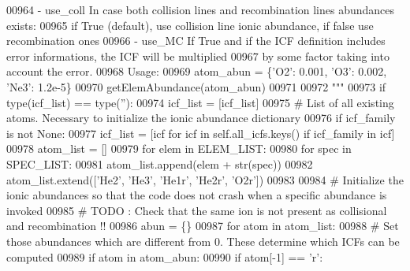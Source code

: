 \begin{DoxyCode}
{{{00964 \textcolor{stringliteral}{           - use\_coll     In case both collision lines and recombination lines abundances exists:}
00965 \textcolor{stringliteral}{                           if True (default), use collision line ionic abundance, if false use
       recombination ones}
00966 \textcolor{stringliteral}{           - use\_MC       If True and if the ICF definition includes error informations, the ICF will be
       multiplied}
00967 \textcolor{stringliteral}{                           by some factor taking into account the error.}
00968 \textcolor{stringliteral}{        Usage:}
00969 \textcolor{stringliteral}{            atom\_abun = \{'O2': 0.001, 'O3': 0.002, 'Ne3': 1.2e-5\}}
00970 \textcolor{stringliteral}{            getElemAbundance(atom\_abun)}
00971 \textcolor{stringliteral}{         }
00972 \textcolor{stringliteral}{        """}
00973         \textcolor{keywordflow}{if} type(icf\_list) == type(\textcolor{stringliteral}{''}):
00974             icf\_list = [icf\_list]
00975         \textcolor{comment}{# List of all existing atoms. Necessary to initialize the ionic abundance dictionary}
00976         \textcolor{keywordflow}{if} icf\_family \textcolor{keywordflow}{is} \textcolor{keywordflow}{not} \textcolor{keywordtype}{None}:
00977             icf\_list = [icf \textcolor{keywordflow}{for} icf \textcolor{keywordflow}{in} self.all\_icfs.keys() \textcolor{keywordflow}{if} icf\_family \textcolor{keywordflow}{in} icf]
00978         atom\_list = []
00979         \textcolor{keywordflow}{for} elem \textcolor{keywordflow}{in} ELEM\_LIST:
00980             \textcolor{keywordflow}{for} spec \textcolor{keywordflow}{in} SPEC\_LIST:
00981                 atom\_list.append(elem + str(spec)) 
00982         atom\_list.extend([\textcolor{stringliteral}{'He2'}, \textcolor{stringliteral}{'He3'}, \textcolor{stringliteral}{'He1r'}, \textcolor{stringliteral}{'He2r'}, \textcolor{stringliteral}{'O2r'}])
00983     
00984         \textcolor{comment}{# Initialize the ionic abundances so that the code does not crash when a specific abundance is
       invoked}
00985         \textcolor{comment}{# TODO : Check that the same ion is not present as collisional and recombination !!}
00986         abun = \{\}
00987         \textcolor{keywordflow}{for} atom \textcolor{keywordflow}{in} atom\_list:
00988             \textcolor{comment}{# Set those abundances which are different from 0. These determine which ICFs can be computed  
            }
00989             \textcolor{keywordflow}{if} atom \textcolor{keywordflow}{in} atom\_abun:
00990                 \textcolor{keywordflow}{if} atom[-1] == \textcolor{stringliteral}{'}\textcolor{stringliteral}{r':}
}}}
\end{DoxyCode}
